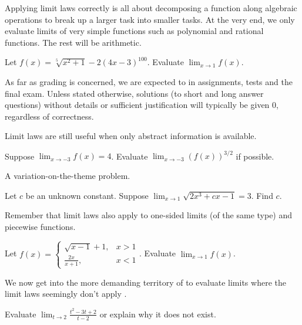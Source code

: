 \documentclass[../main.tex]{subfiles}
\begin{document}
\clearpage

Applying limit laws correctly is all about decomposing a function along algebraic operations to break up a larger task into smaller tasks. At the very end, we only evaluate limits of very simple functions such as polynomial and rational functions. The rest will be arithmetic.
\begin{example}
  Let \(f(x) = \sqrt[5]{x^{2} + 1} - 2 (4x - 3)^{100}\). Evaluate \(\lim_{x \to 1} f(x)\).

\end{example}

\faExclamationTriangle{} As far as grading is concerned, we are expected to  in assignments, tests and the final exam.  Unless stated otherwise, solutions (to short and long answer questions) without details or sufficient justification will typically be given \(0\), regardless of correctness. 
\clearpage

Limit laws are still useful when only abstract information is available.
\begin{example}
  Suppose \(\lim_{x \to -3} f(x) = 4\). Evaluate \(\lim_{x \to -3} \left( f(x) \right)^{3/2}\) if possible.

\end{example}

A variation-on-the-theme problem.  
\begin{exercise}
  Let \(c\) be an unknown constant. Suppose \(\lim_{x \to 1} \sqrt{2x^{3} + cx - 1} = 3\). Find \(c\).

\end{exercise}

Remember that limit laws also apply to one-sided limits (of the same type) and piecewise functions.
\begin{example}
  Let \(f(x) = \begin{cases}\sqrt{x - 1} + 1, &x > 1\\[1ex]\frac{2x}{x + 1}, &x < 1\end{cases}\). Evaluate \(\lim_{x \to 1} f(x)\).

\end{example}

\clearpage
We now get into the more demanding territory of  to evaluate limits where the limit laws seemingly don't apply .

\begin{example} \label{ex:limit-cancellation}
  Evaluate \(\lim_{t \to 2} \frac{t^{2} - 3t + 2}{t - 2}\) or explain why it does not exist.

\end{example}
\end{document}
